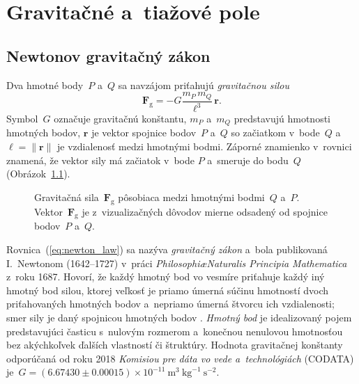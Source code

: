 \documentclass[a4paper, 12pt]{book}
\newcommand{\gidx}{\mathrm g}
\let\vec\mathbf
\begin{document}

\chapter{Gravitačné a~tiažové pole}
\label{sec:gravitational_and_gravity_field}






\section{Newtonov gravitačný zákon}
\label{sec:newton_law}

Dva hmotné body~$P$ a~$Q$ sa navzájom priťahujú \emph{gravitačnou silou}
%
\begin{equation}
\label{eq:newton_law}
\vec F_\gidx = -G \frac{m_P \, m_Q}{\ell^3} \, \vec{r}{.}
\end{equation}
%
Symbol~$G$ označuje gravitačnú konštantu, $m_P$ a~$m_Q$ predstavujú hmotnosti 
hmotných bodov, $\vec r$ je vektor spojnice bodov~$P$ a~$Q$ so začiatkom 
v~bode~$Q$ a~$\ell = \| \vec r \|$ je vzdialenosť medzi hmotnými bodmi.  
Záporné znamienko v~rovnici znamená, že vektor sily má začiatok v~bode $P$ 
a~smeruje do bodu~$Q$ (Obrázok~\ref{fig:newton_law}).

\begin{figure}[b]
\centering

\caption{Gravitačná sila~$\vec F_\gidx$ pôsobiaca medzi hmotnými bodmi~$Q$ 
a~$P$.  Vektor~$\vec F_\gidx$ je z~vizualizačných dôvodov mierne odsadený od 
spojnice bodov~$P$ a~$Q$.}
\label{fig:newton_law}
\end{figure}

Rovnica~(\ref{eq:newton_law}) sa nazýva \emph{gravitačný zákon} a~bola 
publikovaná I.~Newtonom (1642--1727) v~práci \emph{Philosophi\ae Naturalis 
Principia Mathematica} z~roku 1687.  Hovorí, že každý hmotný bod vo vesmíre 
priťahuje každý iný hmotný bod silou, ktorej veľkosť je priamo úmerná súčinu 
hmotností dvoch priťahovaných hmotných bodov a~nepriamo úmerná štvorcu ich 
vzdialenosti; smer sily je daný spojnicou hmotných bodov 
\parencite{Kellogg1967}.  \emph{Hmotný bod} je idealizovaný pojem predstavujúci 
časticu s~nulovým rozmerom a~konečnou nenulovou hmotnosťou bez akýchkoľvek 
ďalších vlastností či štruktúry.  Hodnota gravitačnej konštanty odporúčaná od 
roku 2018 \emph{Komisiou pre dáta vo vede a~technológiách} (CODATA) je~$G 
= (6.67430 \pm 0.00015) \times 10^{-11} \ \mathrm{m}^3 \ \mathrm{kg}^{-1} 
\ \mathrm{s}^{-2}$.
\end{document}
